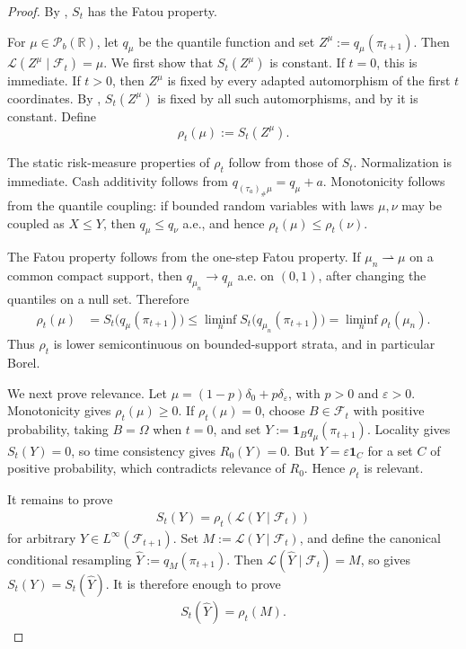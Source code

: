\documentclass[a4paper]{amsart}
\theoremstyle{definition}
\newcommand{\R}{\mathbb{R}}
\newcommand{\F}{\mathcal{F}}
\newcommand{\weaklyto}{\rightharpoonup}
\newcommand{\law}{\mathcal{L}}
\newcommand{\Pc}{\mathcal P}
\begin{document}
\begin{proof}
By , \(S_t\) has the Fatou property.

For \(\mu\in\Pc_b(\R)\), let \(q_\mu\) be the quantile function and set
\(Z^\mu:=q_\mu(\pi_{t+1})\). Then \(\law(Z^\mu\mid\F_t)=\mu\). We first show
that \(S_t(Z^\mu)\) is constant. If \(t=0\), this is immediate. If \(t>0\),
then \(Z^\mu\) is fixed by every adapted automorphism of the first
\(t\) coordinates. By ,
\(S_t(Z^\mu)\) is fixed by all such automorphisms, and by
 it is constant. Define
\[
\rho_t(\mu):=S_t(Z^\mu).
\]

The static risk-measure properties of \(\rho_t\) follow from those of \(S_t\).
Normalization is immediate. Cash additivity follows from
\(q_{(\tau_a)_\#\mu}=q_\mu+a\). Monotonicity follows from the quantile
coupling: if bounded random variables with laws \(\mu,\nu\) may be coupled as
\(X\le Y\), then \(q_\mu\le q_\nu\) a.e., and hence
\(\rho_t(\mu)\le\rho_t(\nu)\).

The Fatou property follows from the one-step Fatou property. If
\(\mu_n\weaklyto\mu\) on a common compact support, then
\(q_{\mu_n}\to q_\mu\) a.e. on \((0,1)\), after changing the quantiles on a
null set. Therefore
\begin{align}
\rho_t(\mu)
&=
S_t\big(q_\mu(\pi_{t+1})\big)
\le
\liminf_n S_t\big(q_{\mu_n}(\pi_{t+1})\big)
=
\liminf_n\rho_t(\mu_n).
\label{eq:rho-fatou-from-St}
\end{align}
Thus \(\rho_t\) is lower semicontinuous on bounded-support strata, and in
particular Borel.

We next prove relevance. Let
\(\mu=(1-p)\delta_0+p\delta_\varepsilon\), with \(p>0\) and
\(\varepsilon>0\). Monotonicity gives \(\rho_t(\mu)\ge0\). If
\(\rho_t(\mu)=0\), choose \(B\in\F_t\) with positive probability, taking
\(B=\Omega\) when \(t=0\), and set \(Y:=\mathbf 1_Bq_\mu(\pi_{t+1})\).
Locality gives \(S_t(Y)=0\), so time consistency gives \(R_0(Y)=0\). But
\(Y=\varepsilon\mathbf 1_C\) for a set \(C\) of positive probability, which
contradicts relevance of \(R_0\). Hence \(\rho_t\) is relevant.

It remains to prove
\begin{align}
S_t(Y)=\rho_t(\law(Y\mid\F_t))
\label{eq:one-step-identification-target}
\end{align}
for arbitrary \(Y\in L^\infty(\F_{t+1})\). Set
\(M:=\law(Y\mid\F_t)\), and define the canonical conditional resampling
\(\widehat Y:=q_M(\pi_{t+1})\). Then
\(\law(\widehat Y\mid\F_t)=M\), so
 gives \(S_t(Y)=S_t(\widehat Y)\). It is
therefore enough to prove
\begin{align}
S_t(\widehat Y)=\rho_t(M).
\label{eq:one-step-resampling-target}
\end{align}


\end{proof}
\end{document}

